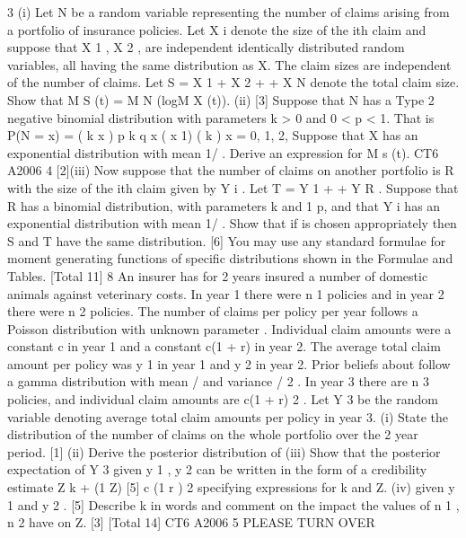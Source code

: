 3
(i) Let N be a random variable representing the number of claims arising from a
portfolio of insurance policies. Let X i denote the size of the ith claim and
suppose that X 1 , X 2 , are independent identically distributed random
variables, all having the same distribution as X. The claim sizes are
independent of the number of claims. Let S = X 1 + X 2 +
+ X N denote the
total claim size. Show that
M S (t) = M N (logM X (t)).
(ii)
[3]
Suppose that N has a Type 2 negative binomial distribution with parameters
k > 0 and 0 < p < 1. That is
P(N = x) =
( k x )
p k q x
( x 1) ( k )
x = 0, 1, 2,
Suppose that X has an exponential distribution with mean 1/ . Derive an
expression for M s (t).
CT6 A2006 4
[2](iii)
Now suppose that the number of claims on another portfolio is R with the size
of the ith claim given by Y i . Let T = Y 1 +
+ Y R . Suppose that R has a
binomial distribution, with parameters k and 1 p, and that Y i has an
exponential distribution with mean 1/ . Show that if is chosen appropriately
then S and T have the same distribution.
[6]
You may use any standard formulae for moment generating functions of
specific distributions shown in the Formulae and Tables.
[Total 11]
8
An insurer has for 2 years insured a number of domestic animals against veterinary
costs. In year 1 there were n 1 policies and in year 2 there were n 2 policies. The
number of claims per policy per year follows a Poisson distribution with unknown
parameter .
Individual claim amounts were a constant c in year 1 and a constant c(1 + r) in year 2.
The average total claim amount per policy was y 1 in year 1 and y 2 in year 2. Prior
beliefs about follow a gamma distribution with mean / and variance / 2 . In
year 3 there are n 3 policies, and individual claim amounts are c(1 + r) 2 . Let Y 3 be the
random variable denoting average total claim amounts per policy in year 3.
(i) State the distribution of the number of claims on the whole portfolio over the 2
year period.
[1]
(ii) Derive the posterior distribution of
(iii) Show that the posterior expectation of Y 3 given y 1 , y 2 can be written in the
form of a credibility estimate
Z
k + (1
Z)
[5]
c (1 r ) 2
specifying expressions for k and Z.
(iv)
given y 1 and y 2 .
[5]
Describe k in words and comment on the impact the values of n 1 , n 2 have
on Z.
[3]
[Total 14]
CT6 A2006 5
PLEASE TURN OVER

